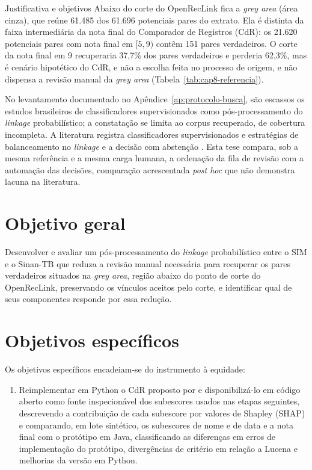 \begin{chapter}{Justificativa e objetivos}
Abaixo do corte do OpenRecLink fica a \textit{grey area} (área cinza), que reúne 61.485 dos 61.696 potenciais pares do extrato. Ela é distinta da faixa intermediária da nota final do Comparador de Registros (CdR): os 21.620 potenciais pares com nota final em $[5,9)$ contêm 151 pares verdadeiros. O corte da nota final em 9 recuperaria 37,7\% dos pares verdadeiros e perderia 62,3\%, mas é cenário hipotético do CdR, e não a escolha feita no processo de origem, e não dispensa a revisão manual da \textit{grey area} (Tabela~\ref{tab:cap8-referencia}).

No levantamento documentado no Apêndice~\ref{ap:protocolo-busca}, são escassos os estudos brasileiros de classificadores supervisionados como pós-processamento do \textit{linkage} probabilístico; a constatação se limita ao corpus recuperado, de cobertura incompleta. A literatura registra classificadores supervisionados e estratégias de balanceamento no \textit{linkage} \cite{Christen2012book,Binette2022entity,Hassani2025oversampling} e a decisão com abstenção \cite{Sadinle2017}. Esta tese compara, sob a mesma referência e a mesma carga humana, a ordenação da fila de revisão com a automação das decisões, comparação acrescentada \textit{post hoc} que não demonstra lacuna na literatura.

\section{Objetivo geral}\label{sec:objetivo-geral}

Desenvolver e avaliar um pós-processamento do \textit{linkage} probabilístico entre o SIM e o Sinan-TB que reduza a revisão manual necessária para recuperar os pares verdadeiros situados na \textit{grey area}, região abaixo do ponto de corte do OpenRecLink, preservando os vínculos aceitos pelo corte, e identificar qual de seus componentes responde por essa redução.

\section{Objetivos específicos}\label{sec:objetivos-especificos}

Os objetivos específicos encadeiam-se do instrumento à equidade:

\begin{enumerate}

\item Reimplementar em Python o CdR proposto por  e disponibilizá-lo em código aberto como fonte inspecionável dos subescores usados nas etapas seguintes, descrevendo a contribuição de cada subescore por valores de Shapley (SHAP) e comparando, em lote sintético, os subescores de nome e de data e a nota final com o protótipo em Java, classificando as diferenças em erros de implementação do protótipo, divergências de critério em relação a Lucena e melhorias da versão em Python.


\end{enumerate}
\end{chapter}
